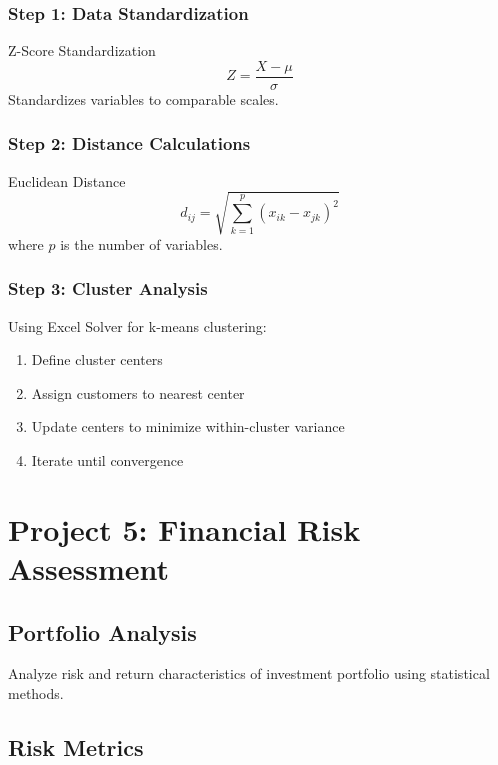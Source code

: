 \documentclass[12pt,a4paper]{book}
\begin{document}
{{\subsubsection{Step 1: Data Standardization}

\begin{definition}{Z-Score Standardization}
\[
Z = \frac{X - \mu}{\sigma}
\]
Standardizes variables to comparable scales.
\end{definition}

\subsubsection{Step 2: Distance Calculations}

\begin{definition}{Euclidean Distance}
\[
d_{ij} = \sqrt{\sum_{k=1}^{p} (x_{ik} - x_{jk})^2}
\]
where $p$ is the number of variables.
\end{definition}

\subsubsection{Step 3: Cluster Analysis}

Using Excel Solver for k-means clustering:
\begin{enumerate}
    \item Define cluster centers
    \item Assign customers to nearest center
    \item Update centers to minimize within-cluster variance
    \item Iterate until convergence
\end{enumerate}

\section{Project 5: Financial Risk Assessment}

\subsection{Portfolio Analysis}

Analyze risk and return characteristics of investment portfolio using statistical methods.

\subsection{Risk Metrics}

}}
\end{document}
